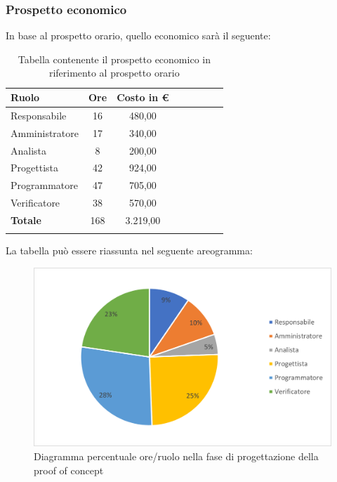			\subsubsection{Prospetto economico}
			In base al prospetto orario, quello economico sarà il seguente: 
			
			\begin{longtable}{|l|c|c|c|c|c|c|c|}
				\hline
				\rowcolor{lighter-grayer}
				\textbf{Ruolo} & \textbf{Ore} & \textbf{Costo in €} \\
				\hline
				\endfirsthead
				
				\hline
				Responsabile & 16 & 480,00\\
				\hline
				\hline
				Amministratore & 17 & 340,00\\
				\hline
				\hline
				Analista & 8 & 200,00\\
				\hline
				\hline
				Progettista & 42 & 924,00\\
				\hline
				\hline
				Programmatore & 47 & 705,00\\
				\hline
				\hline
				Verificatore & 38 & 570,00\\
				\hline
				\hline
				\textbf{Totale} & 168 & 3.219,00\\
				\hline
				\rowcolor{white}
				\caption{Tabella contenente il prospetto economico in riferimento al prospetto orario}
			\end{longtable}
			\pagebreak
		
			La tabella può essere riassunta nel seguente areogramma:
			\begin{figure}[H]
				\centering
				\includegraphics[width=0.8\linewidth]{res/images/preventivo/4-2.png}
				\caption{Diagramma percentuale ore/ruolo nella fase di progettazione della proof of concept}
				\label{fig:diagramma costi ruolo fase progettazione della proof of concept}
            \end{figure}

